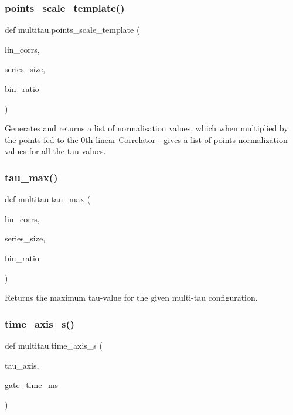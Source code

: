 \subsubsection{\texorpdfstring{points\+\_\+scale\+\_\+template()}{points\_scale\_template()}}
{\footnotesize\ttfamily def multitau.\+points\+\_\+scale\+\_\+template (\begin{DoxyParamCaption}\item[{}]{lin\+\_\+corrs,  }\item[{}]{series\+\_\+size,  }\item[{}]{bin\+\_\+ratio }\end{DoxyParamCaption})}

\begin{DoxyVerb}Generates and returns a list of normalisation values, which when multiplied by the points
fed to the 0th linear Correlator - gives a list of points normalization values for all
the tau values.
\end{DoxyVerb}
 \mbox{\label{namespacemultitau_a9516fc9217f79f4dc1c4f2dfb28c9b7a}} 
\subsubsection{\texorpdfstring{tau\+\_\+max()}{tau\_max()}}
{\footnotesize\ttfamily def multitau.\+tau\+\_\+max (\begin{DoxyParamCaption}\item[{}]{lin\+\_\+corrs,  }\item[{}]{series\+\_\+size,  }\item[{}]{bin\+\_\+ratio }\end{DoxyParamCaption})}

\begin{DoxyVerb}Returns the maximum tau-value for the given multi-tau configuration.
\end{DoxyVerb}
 \mbox{\label{namespacemultitau_aa907c1cffb653422b45f46332192b2a4}} 
\subsubsection{\texorpdfstring{time\+\_\+axis\+\_\+s()}{time\_axis\_s()}}
{\footnotesize\ttfamily def multitau.\+time\+\_\+axis\+\_\+s (\begin{DoxyParamCaption}\item[{}]{tau\+\_\+axis,  }\item[{}]{gate\+\_\+time\+\_\+ms }\end{DoxyParamCaption})}

